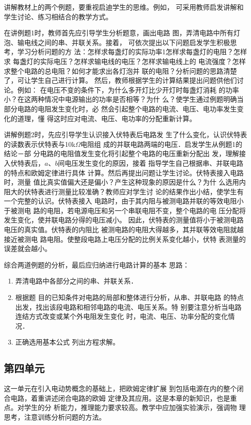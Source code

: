 讲解教材上的两个例题，要重视启迪学生的思维。例如，
可采用教师启发讲解和学生讨论、练习相结合的教学方式。

在讲例题1时，教师首先应引导学生分析题意，画出电路
图，弄清电路中所有灯泡、输电线之间的串、并联关系。接着，
可依次提出以下问题启发学生积极思考，学习分析问题的方
法：怎样求每盏灯的实际功率1怎样求每盏灯的电阻？怎样求
每盏灯的实际电压？怎样求输电线的电压？怎样求输电线上的
电流强度？怎样求整个电路的总电阻？如何才能求出各灯泡并
联的电阻？分析问题的思路清楚了，可让学生自己进行计算。
然后，教师根据学生的计算结果提出问题供他们讨论。例如：
在电压不变的条件下，为什么多开灯比少开灯时每盏灯消耗
的功率小？在这两种情况中电源输出的功率是否相等？为什
么？使学生通过例题明确当部分电路的电阻发生变化时，必
然会引起整个电路的电流、电压、电功率发生变化的道理，懂
得这时应对电流、电压、电功率的分配重新计算。

讲解例题2时，先应引导学生认识接入伏特表后电路发
生了什么变化，认识伏特表的读数表示伏特表与10k$\Omega$电阻组
成的并联电路两端的电压．启发学生从例题1的结论－部
分电路的电阻值发生变化将引起整个电路的电压重新分配出
发，理解接入伏特表后，$a$、$b$间电压发生变化的原因，接着
指导学生自己根据串、并联电路的特点和欧姆定律进行具体
计算。然后再提出问题让学生讨论。伏特表接入电路时，测量
值比真实值偏大还是偏小？产生这种现象的原因是什么？为什
么选用内阻大的伏特表进行测量比较准确？教师应对学生讨
论的结果作出小结，使学生有一个完整的认识。伏特表接入
电路时，由于其内阻与被测电路并联的等效电阻小于被测电
路的电阻，若电源电压和另一个串联电阻不变，整个电路的电
压分配将发生变化，使并联电路分得的电压减小。
因此，伏特表的测量值将小于被测电路电压的真实值。伏特表的内阻比
被测电路的电阻大得越多，其并联等效电阻就越接近被测电
路电阻。使整段电路上电压分配的比例关系变化越小，伏特
表测量的误差就会越小。

综合两道例题的分析，最后应归纳进行电路计算的基本
思路：
\begin{enumerate}
\item 弄清电路中各部分之间的串、并联关系．
\item 根据题
目的已知条件对电路的局部和整体进行分析，从串、并联电路
的特点出发，找出该段电路和相邻电路的电流、电压关系。特
别要注意分析当电路连结方式改变或某个外电阻发生变化
时，电流、电压、功率分配的变化情况．
\item 正确选用基本公式
列出方程求解。
\end{enumerate}

\subsection{第四单元}
这一单元在引入电动势概念的基础上，把欧姆定律扩展
到包括电源在内的整个闭合电路，着重讲述闭合电路的欧姆
定律及其应用。这是本章的新知识，也是重点。对学生的分
析能力，推理能力要求较高。教学中应加强实验演示，强调物
理思考，注意训练分析问题的方法。


